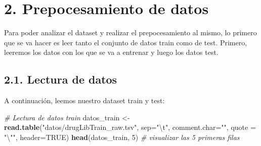 \documentclass[spanish,]{article}
\newenvironment{Shaded}{\begin{snugshade}}{\end{snugshade}}
\newcommand{\KeywordTok}[1]{\textcolor[rgb]{0.13,0.29,0.53}{\textbf{#1}}}
\newcommand{\DataTypeTok}[1]{\textcolor[rgb]{0.13,0.29,0.53}{#1}}
\newcommand{\DecValTok}[1]{\textcolor[rgb]{0.00,0.00,0.81}{#1}}
\newcommand{\CharTok}[1]{\textcolor[rgb]{0.31,0.60,0.02}{#1}}
\newcommand{\StringTok}[1]{\textcolor[rgb]{0.31,0.60,0.02}{#1}}
\newcommand{\CommentTok}[1]{\textcolor[rgb]{0.56,0.35,0.01}{\textit{#1}}}
\newcommand{\OtherTok}[1]{\textcolor[rgb]{0.56,0.35,0.01}{#1}}
\newcommand{\NormalTok}[1]{#1}
\begin{document}
\section{2. Prepocesamiento de datos}\label{prepocesamiento-de-datos}

Para poder analizar el dataset y realizar el prepocesamiento al mismo,
lo primero que se va hacer es leer tanto el conjunto de datos train como
de test. Primero, leeremos los datos con los que se va a entrenar y
luego los datos test.

\subsection{2.1. Lectura de datos}\label{lectura-de-datos}

A continuación, leemos nuestro dataset train y test:

\begin{Shaded}
\begin{Highlighting}[]
\CommentTok{# Lectura de datos train}
\NormalTok{datos_train <-}\StringTok{ }\KeywordTok{read.table}\NormalTok{(}\StringTok{"datos/drugLibTrain_raw.tsv"}\NormalTok{, }\DataTypeTok{sep=}\StringTok{"}\CharTok{\textbackslash{}t}\StringTok{"}\NormalTok{, }\DataTypeTok{comment.char=}\StringTok{""}\NormalTok{,}
                          \DataTypeTok{quote =} \StringTok{"}\CharTok{\textbackslash{}"}\StringTok{"}\NormalTok{, }\DataTypeTok{header=}\OtherTok{TRUE}\NormalTok{)}
\KeywordTok{head}\NormalTok{(datos_train, }\DecValTok{5}\NormalTok{) }\CommentTok{# visualizar las 5 primeras filas}
\end{Highlighting}
\end{Shaded}
\end{document}
